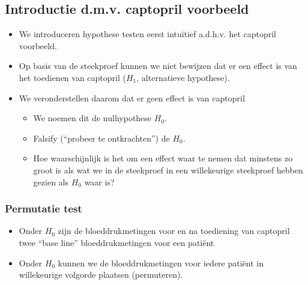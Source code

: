 \documentclass[
  dutch,
  letterpaper,
  12pt]{book}
\theoremstyle{definition}
\theoremstyle{definition}
\theoremstyle{definition}
\theoremstyle{remark}
\begin{document}
\subsection{Introductie d.m.v. captopril
voorbeeld}\label{introductie-d.m.v.-captopril-voorbeeld}

\begin{itemize}
\item
  We introduceren hypothese testen eerst intuïtief a.d.h.v. het
  captopril voorbeeld.
\item
  Op basis van de steekproef kunnen we niet bewijzen dat er een effect
  is van het toedienen van captopril (\(H_1\), alternatieve hypothese).
\item
  We veronderstellen daarom dat er geen effect is van captopril

  \begin{itemize}
  \item
    We noemen dit de nulhypothese \(H_0\).
  \item
    Falsify (``probeer te ontkrachten'') de \(H_0\).
  \item
    Hoe waarschijnlijk is het om een effect waar te nemen dat minstens
    zo groot is als wat we in de steekproef in een willekeurige
    steekproef hebben gezien als \(H_0\) waar is?
  \end{itemize}
\end{itemize}

\subsubsection{Permutatie test}\label{permutatie-test}

\begin{itemize}
\item
  Onder \(H_0\) zijn de bloeddrukmetingen voor en na toediening van
  captopril twee ``base line'' bloeddrukmetingen voor een patiënt
\item
  Onder \(H_0\) kunnen we de bloeddrukmetingen voor iedere patiënt in
  willekeurige volgorde plaatsen (permuteren).
\end{itemize}
\end{document}
